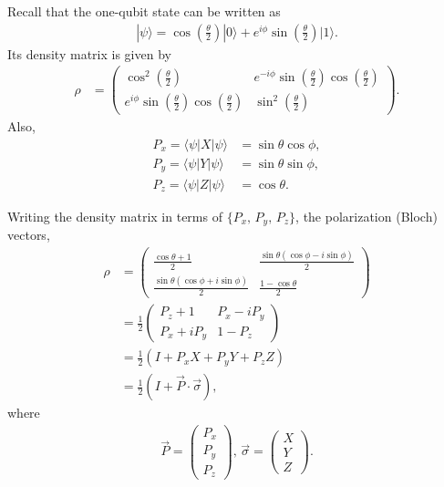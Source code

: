 \documentclass{beamer}
\begin{document}
\begin{frame}
\justify
Recall that the one-qubit state can be written as
\begin{align*}
|\psi\rangle = \cos\left(\frac{\theta}{2}\right) |0\rangle + e^{i \phi} \sin\left(\frac{\theta}{2}\right) |1\rangle.
\end{align*}
\vfill
Its density matrix is given by
\begin{align*}
\rho & = \begin{pmatrix}
\cos^2 \left(\frac{\theta}{2}\right) & e^{-i\phi} \sin \left(\frac{\theta}{2}\right) \cos \left(\frac{\theta}{2}\right) \\ e^{i\phi} \sin \left(\frac{\theta}{2}\right) \cos \left(\frac{\theta}{2}\right) & \sin^2 \left(\frac{\theta}{2}\right)
\end{pmatrix}.
\end{align*}
\vfill
Also,
\begin{align*}
P_x = \langle\psi|X|\psi\rangle & = \sin\theta \cos\phi, \\
P_y = \langle\psi|Y|\psi\rangle & = \sin\theta \sin\phi, \\
P_z = \langle\psi|Z|\psi\rangle & = \cos\theta.
\end{align*}
\end{frame}

\begin{frame}
\justify
Writing the density matrix in terms of $\{P_x,\, P_y,\, P_z\}$, the polarization (Bloch) vectors,
\begin{align*}
\rho & = \begin{pmatrix}
\frac{\cos\theta +1}{2} & \frac{\sin\theta(\cos\phi - i \sin\phi)}{2} \\ \frac{\sin\theta (\cos\phi + i\sin\phi)}{2} & \frac{1-\cos\theta}{2}
\end{pmatrix} \nonumber \\
& = \frac{1}{2} \begin{pmatrix}
P_z + 1 & P_x - i P_y \\ P_x + iP_y & 1 - P_z
\end{pmatrix} \nonumber \\
& = \frac{1}{2} \left( I + P_x X + P_y Y + P_z Z \right) \nonumber \\
& = \frac{1}{2} \left( I + \vec{P} \cdot \vec{\sigma} \right),
\end{align*}
where
\begin{align*}
\vec{P} = \begin{pmatrix} P_x \\ P_y \\ P_z \end{pmatrix},\, \vec{\sigma} = \begin{pmatrix} X \\ Y \\ Z \end{pmatrix}.
\end{align*}
\end{frame}
\end{document}
